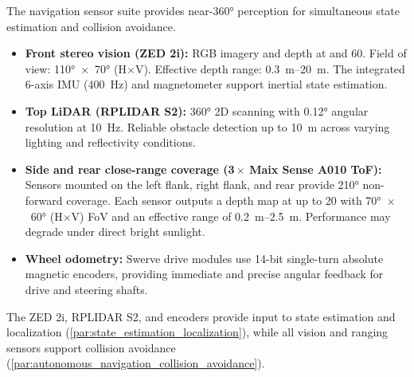 
The navigation sensor suite provides near-\ang{360} perception for simultaneous state estimation and collision avoidance.

\begin{itemize}
	\item \textbf{Front stereo vision (ZED 2i):} RGB imagery and depth at  and \qty{60}{\fps}. Field of view: \ang{110}~$\times$~\ang{70} (H$\times$V). Effective depth range: \qtyrange{0.3}{20}{\metre}. The integrated 6-axis IMU (\qty{400}{\hertz}) and magnetometer support inertial state estimation.

	\item \textbf{Top LiDAR (RPLIDAR S2):} \ang{360} 2D scanning with \ang{0.12} angular resolution at \qty{10}{\hertz}. Reliable obstacle detection up to \qty{10}{\metre} across varying lighting and reflectivity conditions.

	\item \textbf{Side and rear close-range coverage (3\,$\times$ Maix Sense A010 ToF):} Sensors mounted on the left flank, right flank, and rear provide \ang{210} non-forward coverage. Each sensor outputs a  depth map at up to \qty{20}{\fps} with \ang{70}~$\times$~\ang{60} (H$\times$V) FoV and an effective range of \qtyrange{0.2}{2.5}{\metre}. Performance may degrade under direct bright sunlight.

	\item \textbf{Wheel odometry:} Swerve drive modules use 14-bit single-turn absolute magnetic encoders, providing immediate and precise angular feedback for drive and steering shafts.
\end{itemize}

The ZED 2i, RPLIDAR S2, and encoders provide input to state estimation and localization (\autoref{par:state_estimation_localization}), while all vision and ranging sensors support collision avoidance (\autoref{par:autonomous_navigation_collision_avoidance}).